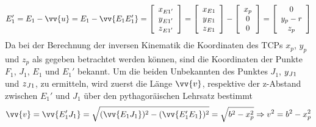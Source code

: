 \documentclass[Bachelor, BMR, ngerman]{twbook}
\begin{document}
    \newline
    \begin{align}
        E_1' = E_1 - \vv{u} = E_1 - \vv{E_1E_1'} =
            \left[
                \begin{array}{c} 
                    x\textsubscript{$E1'$}\\
                    y\textsubscript{$E1'$}\\
                    z\textsubscript{$E1'$} 
                \end{array}
            \right] =
            \left[
                \begin{array}{c} 
                    x\textsubscript{$E1$}\\
                    y\textsubscript{$E1$}\\
                    z\textsubscript{$E1$} 
                \end{array}
            \right] -
            \left[
                \begin{array}{c} 
                    x_p\\
                    0\\
                    0 
                \end{array}
            \right] =
            \left[
                \begin{array}{c} 
                    0\\
                    y_p - r\\
                    z_p 
                \end{array}
            \right]
        \label{eq:E1'}
    \end{align}
    \noindent
    Da bei der Berechnung der inversen Kinematik die Koordinaten des TCPs $x_p$, $y_p$ und $z_p$ als
    gegeben betrachtet werden können, sind die Koordinaten der Punkte $F_1$, $J_1$, $E_1$ und $E_1'$ bekannt. Um die beiden Unbekannten des Punktes $J_1$, $y\textsubscript{$J1$}$ und $z\textsubscript{$J1$}$, zu ermitteln, wird zuerst die Länge $\vv{v}$, respektive der z-Abstand zwischen $E_1'$ und $J_1$ über den pythagoräischen Lehrsatz bestimmt
    \newline
    \begin{align}
        \vv{v} = \vv{E_1'J_1} = \sqrt{(\vv{E_1J_1})^2-(\vv{E_1'E_1})^2} = \sqrt{b^2 - x_p^2} \Rightarrow v^2 = b^2 - x_p^2
        \label{eq:v}
    \end{align}
\end{document}
